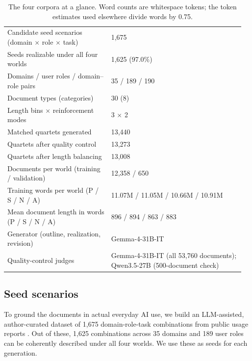\documentclass{article} %
\begin{document}
\begin{table}[htbp]
\centering\small
\begin{tabular}{@{}p{0.42\linewidth}p{0.54\linewidth}@{}}
\toprule
Candidate seed scenarios (domain $\times$ role $\times$ task) & 1,675 \\
Seeds realizable under all four worlds & 1,625 (97.0\%) \\
Domains / user roles / domain--role pairs & 35 / 189 / 190 \\
Document types (categories) & 30 (8) \\
Length bins $\times$ reinforcement modes & 3 $\times$ 2 \\
Matched quartets generated & 13,440 \\
Quartets after quality control & 13,273 \\
Quartets after length balancing & 13,008 \\
Documents per world (training / validation) & 12,358 / 650 \\
Training words per world (P / S / N / A) & 11.07M / 11.05M / 10.66M / 10.91M \\
Mean document length in words (P / S / N / A) & 896 / 894 / 863 / 883 \\
Generator (outline, realization, revision) & Gemma-4-31B-IT \\
Quality-control judges & Gemma-4-31B-IT (all 53,760 documents); Qwen3.5-27B (500-document check) \\
\bottomrule
\end{tabular}
\caption{The four corpora at a glance. Word counts are whitespace tokens; the token estimates used elsewhere divide words by 0.75.}
\label{tab:corpus-glance}
\end{table}

\subsection{Seed scenarios}
\label{app:corpus-seeds}

To ground the documents in actual everyday AI use, we build an LLM-assisted, author-curated dataset of 1,675 domain-role-task combinations from public usage reports \citep{chatterji2025people, tamkin2024clio}. Out of these, 1,625 combinations across 35 domains and 189 user roles can be coherently described under all four worlds. We use these as seeds for each generation.
\end{document}
